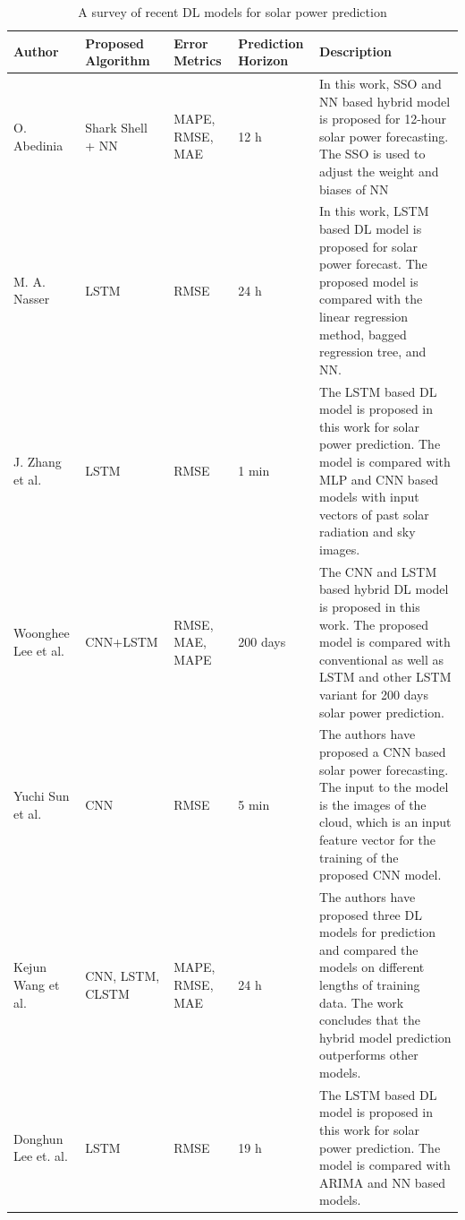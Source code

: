 \documentclass[a4paper,fleqn]{cas-sc}
\begin{document}
\begin{longtable}[c]{|p{}|p{}|p{}|p{}|p{}|}
  \caption{A survey of recent DL models for solar power prediction}
  \label{tab:my-table}\\
  \hline
  \textbf{Author} & \textbf{Proposed Algorithm} & \textbf{Error Metrics} & \textbf{Prediction Horizon} & \textbf{Description} \\
  \hline
  \endhead
  O. Abedinia\cite{lee2018forecasting} & Shark Shell + NN & MAPE, RMSE, MAE & 12 h & In this work, SSO and NN based hybrid model is proposed for 12-hour solar power forecasting. The SSO is used to adjust the weight and biases of NN \\ \hline
  M. A. Nasser\cite{abedinia2018solar} & LSTM & RMSE & 24 h & In this work, LSTM based DL model is proposed for solar power forecast. The proposed model is compared with the linear regression method, bagged regression tree, and NN. \\ \hline
  J. Zhang et al.\cite{abedinia2018solar} & LSTM & RMSE & 1 min & The LSTM based DL model is proposed in this work for solar power prediction. The model is compared with MLP and CNN based models with input vectors of past solar radiation and sky images. \\ \hline
  Woonghee Lee et al.\cite{lee2018forecasting} & CNN+LSTM & RMSE, MAE, MAPE & 200 days & The CNN and LSTM based hybrid DL model is proposed in this work. The proposed model is compared with conventional as well as LSTM and other LSTM variant for 200 days solar power prediction. \\
  Yuchi Sun et al. \cite{zhang2018deep} & CNN & RMSE & 5 min & The authors have proposed a CNN based solar power forecasting. The input to the model is the images of the cloud, which is an input feature vector for the training of the proposed CNN model. \\ \hline
  Kejun Wang et al.\cite{wang2019comparison} & CNN, LSTM, CLSTM & MAPE, RMSE, MAE & 24 h & The authors have proposed three DL models for prediction and compared the models on different lengths of training data. The work concludes that the hybrid model prediction outperforms other models. \\ \hline
  Donghun Lee et. al.\cite{lee2019deep} & LSTM & RMSE & 19 h & The LSTM based DL model is proposed in this work for solar power prediction. The model is compared with ARIMA and NN based models. \\

\end{longtable}
\end{document}
